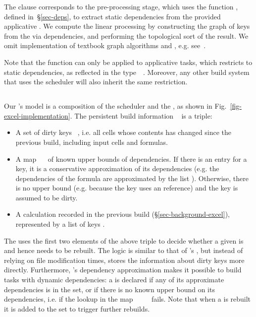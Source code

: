 The  clause corresponds to the pre-processing stage, which uses the
function , defined in~\S\ref{sec-deps}, to extract static
dependencies from the provided applicative . We compute the linear
processing  by constructing the graph of keys  from the
 via dependencies, and performing the topological sort of the result.
We omit implementation of textbook graph algorithms
 and , e.g. see~\cite{cormen2001introduction}.

Note that the function  can only be applied to applicative
tasks, which restricts \Make to static dependencies, as reflected in the
type~~. Moreover, any other build system that uses
the  scheduler will also inherit the same restriction.

\subsection{\Excel}\label{sec-implementation-excel}

Our \Excel's model is a composition of the  scheduler and the
, as shown in Fig.~\ref{fig-excel-implementation}.
The persistent build information ~ is a triple:

\begin{itemize}
    \item A set of dirty keys ~, i.e. all cells whose contents
          has changed since the previous build, including input cells and
          formulas.
    \item A map ~~\hs{[@@k]} of known upper bounds of
          dependencies. If there is an entry for a key, it is a conservative
          approximation of its dependencies (e.g. the dependencies of the
          formula  are approximated by the list
          \hs{[}\hs{,}\hs{,}\hs{]}). Otherwise, there is
          no upper bound (e.g. because the key uses an  reference)
          and the key is assumed to be dirty.
    \item A calculation  recorded in the previous build
          (\S\ref{sec-background-excel}), represented by a list of keys \hs{[@@k]}.
\end{itemize}

The  uses the first two elements of the above triple
to decide whether a given  is  and hence needs to be rebuilt.
The logic is similar to that of \Make's , but instead of
relying on file modification times, \Excel stores the information about dirty
keys more directly. Furthermore, \Excel's dependency approximation makes it
possible to build tasks with dynamic dependencies: a  is declared
 if any of its approximate dependencies is in the  set,
or if there is no known upper bound on its dependencies, i.e. if the lookup in
the map ~\hs{::}~~~\hs{[@@k]} fails. Note that when a
 is rebuilt it is added to the set  to trigger further
rebuilds.

